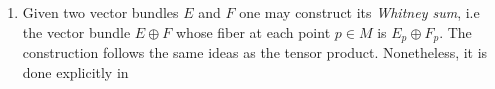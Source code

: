 \begin{example}
\begin{enumerate}
        \item Given two vector bundles \(E\) and \(F\) one may construct its \textit{Whitney sum}, i.e the vector bundle \(E \oplus F\) whose fiber at each point \(p \in M\) is \(E_p \oplus F_p\). The construction follows the same ideas as the tensor product. Nonetheless, it is done explicitly in \parencite[Example 10.7]{lee_introSM}

\end{enumerate}
\end{example}
